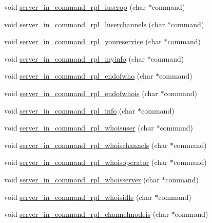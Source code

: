 \begin{DoxyCompactItemize}
void \hyperlink{G-2313-06-P2__client__function__handlers_8h_aa885b5d729d8a920a1c38678abdbe6b7}{server\+\_\+in\+\_\+command\+\_\+rpl\+\_\+luserop} (char $\ast$command)
\item 
void \hyperlink{G-2313-06-P2__client__function__handlers_8h_ae53c29cff5b1b8b3981be92c317cf29d}{server\+\_\+in\+\_\+command\+\_\+rpl\+\_\+luserchannels} (char $\ast$command)
\item 
void \hyperlink{G-2313-06-P2__client__function__handlers_8h_a9a54a1989e86596904bc4d1c2618ba84}{server\+\_\+in\+\_\+command\+\_\+rpl\+\_\+youreservice} (char $\ast$command)
\item 
void \hyperlink{G-2313-06-P2__client__function__handlers_8h_aa4c4d377b1cde9f0b40997a54c81c3de}{server\+\_\+in\+\_\+command\+\_\+rpl\+\_\+myinfo} (char $\ast$command)
\item 
void \hyperlink{G-2313-06-P2__client__function__handlers_8h_a441993de1d4be974fab21e17aacc553e}{server\+\_\+in\+\_\+command\+\_\+rpl\+\_\+endofwho} (char $\ast$command)
\item 
void \hyperlink{G-2313-06-P2__client__function__handlers_8h_a56185c77cfea8620c1ce413a44865bc4}{server\+\_\+in\+\_\+command\+\_\+rpl\+\_\+endofwhois} (char $\ast$command)
\item 
void \hyperlink{G-2313-06-P2__client__function__handlers_8h_a6477df39f199931be3274e311a18b276}{server\+\_\+in\+\_\+command\+\_\+rpl\+\_\+info} (char $\ast$command)
\item 
void \hyperlink{G-2313-06-P2__client__function__handlers_8h_af2190c9ca68abe019cde6f3a18e380c2}{server\+\_\+in\+\_\+command\+\_\+rpl\+\_\+whoisuser} (char $\ast$command)
\item 
void \hyperlink{G-2313-06-P2__client__function__handlers_8h_a7ed4d1bd7f485fe7c6d26bd1d8eef662}{server\+\_\+in\+\_\+command\+\_\+rpl\+\_\+whoischannels} (char $\ast$command)
\item 
void \hyperlink{G-2313-06-P2__client__function__handlers_8h_a890fb67530ca5c1f5c14da877fc9ba21}{server\+\_\+in\+\_\+command\+\_\+rpl\+\_\+whoisoperator} (char $\ast$command)
\item 
void \hyperlink{G-2313-06-P2__client__function__handlers_8h_a27bc970f66b7e5a2f3806853c3fa156f}{server\+\_\+in\+\_\+command\+\_\+rpl\+\_\+whoisserver} (char $\ast$command)
\item 
void \hyperlink{G-2313-06-P2__client__function__handlers_8h_ada14de5a081899ca2b5eccbfb9779d62}{server\+\_\+in\+\_\+command\+\_\+rpl\+\_\+whoisidle} (char $\ast$command)
\item 
void \hyperlink{G-2313-06-P2__client__function__handlers_8h_a23ae57a558e401f83bc03209efb34be2}{server\+\_\+in\+\_\+command\+\_\+rpl\+\_\+channelmodeis} (char $\ast$command)

\end{DoxyCompactItemize}
